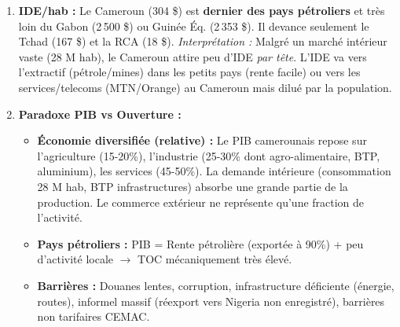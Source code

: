 \documentclass[11pt]{article}
\begin{document}
\begin{exoresolu}
\begin{enumerate}
\begin{center}
\begin{tabularx}{\linewidth}{|l|X|X|X|}
    Tchad & $\frac{4+2,5}{13}\times100 = \textbf{50,0}$ & $\frac{4}{2,5}\times100 = \textbf{160,0}$ & $\frac{3}{18} = \textbf{167}$ \\ \hline
    Guinée Éq. & $\frac{8+2}{12}\times100 = \textbf{83,3}$ & $\frac{8}{2}\times100 = \textbf{400,0}$ & $\frac{4}{1,7} = \textbf{2\,353}$ \\ \hline
    RCA & $\frac{0,2+0,5}{2,5}\times100 = \textbf{28,0}$ & $\frac{0,2}{0,5}\times100 = \textbf{40,0}$ & $\frac{0,1}{5,5} = \textbf{18}$ \\ \hline
    Congo & $\frac{5+3}{12}\times100 = \textbf{66,7}$ & $\frac{5}{3}\times100 = \textbf{166,7}$ & $\frac{5}{5,8} = \textbf{862}$ \\ \hline
    \end{tabularx}
    \end{center}
    \textbf{Classement TOC (Ouverture) :} 1. Guinée Éq. (83\%), 2. Gabon (67,5\%), 3. Congo (66,7\%), 4. Tchad (50\%), 5. Cameroun (29,5\%), 6. RCA (28\%).
    \textbf{Analyse TC :} Seul le Cameroun, la RCA et (légèrement) le Tchad ont un TC $< 100\%$ (déficit). Les pays pétroliers (Gabon, G.Éq., Congo) ont des excédents massifs.
    \item \textbf{IDE/hab :} Le Cameroun (304 \$) est \textbf{dernier des pays pétroliers} et très loin du Gabon (2\,500 \$) ou Guinée Éq. (2\,353 \$). Il devance seulement le Tchad (167 \$) et la RCA (18 \$).
    \textit{Interprétation :} Malgré un marché intérieur vaste (28 M hab), le Cameroun attire peu d'IDE \emph{par tête}. L'IDE va vers l'extractif (pétrole/mines) dans les petits pays (rente facile) ou vers les services/telecoms (MTN/Orange) au Cameroun mais dilué par la population.
    \item \textbf{Paradoxe PIB vs Ouverture :}
    \begin{itemize}
        \item \textbf{Économie diversifiée (relative) :} Le PIB camerounais repose sur l'agriculture (15-20\%), l'industrie (25-30\% dont agro-alimentaire, BTP, aluminium), les services (45-50\%). La demande intérieure (consommation 28 M hab, BTP infrastructures) absorbe une grande partie de la production. Le commerce extérieur ne représente qu'une fraction de l'activité.
        \item \textbf{Pays pétroliers :} PIB = Rente pétrolière (exportée à 90\%) + peu d'activité locale $\rightarrow$ TOC mécaniquement très élevé.
        \item \textbf{Barrières :} Douanes lentes, corruption, infrastructure déficiente (énergie, routes), informel massif (réexport vers Nigeria non enregistré), barrières non tarifaires CEMAC.

\end{itemize}
\end{enumerate}
\end{exoresolu}
\end{document}
